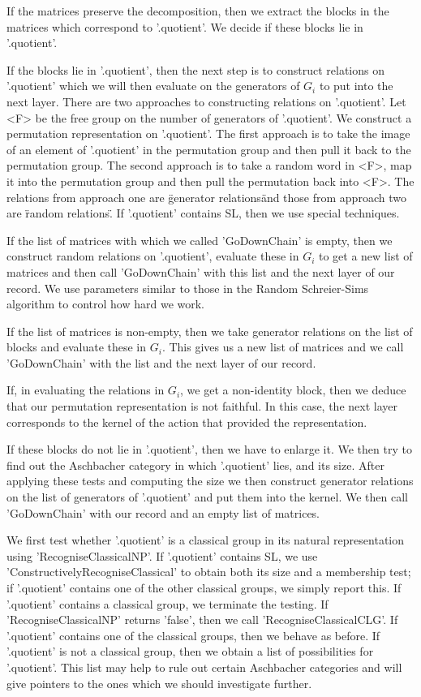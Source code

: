 If the matrices preserve the decomposition, then we extract the blocks in
the matrices  which correspond to '.quotient'. We  decide if these blocks
lie in '.quotient'.

If  the blocks lie  in  '.quotient', then the next   step is to construct
relations on '.quotient' which we will then evaluate on the generators of
$G_i$    to put into  the   next  layer. There   are   two approaches  to
constructing relations on  '.quotient'. Let <F>  be the free group on the
number of generators   of   '.quotient'.   We construct  a    permutation
representation on '.quotient'. The first approach is to take the image of
an element of '.quotient' in the permutation group and  then pull it back
to the permutation group. The second approach is to take a random word in
<F>, map it into the permutation group and then pull the permutation back
into <F>. The relations from approach one are \"generator relations\" and
those  from  approach two   are  \"random  relations\".   If  '.quotient'
contains SL, then we use special techniques.

If the list of matrices with which we called 'GoDownChain' is empty, then
we construct random relations on '.quotient', evaluate  these in $G_i$ to
get a new list of matrices and then call 'GoDownChain' with this list and
the next layer of our  record. We use parameters similar  to those in the
Random Schreier-Sims algorithm to control how hard we work.

If the list of matrices is non-empty, then we take generator relations on
the list of blocks and evaluate these in $G_i$.  This gives us a new list
of matrices and we call 'GoDownChain' with the list and the next layer of
our record.

If, in evaluating the  relations in $G_i$, we   get a non-identity block,
then we  deduce that our permutation  representation is not  faithful. In
this case,  the next layer  corresponds to the kernel  of the action that
provided the representation.

If these blocks do not lie in '.quotient', then we have to enlarge it. We
then try to find  out the Aschbacher  category in which '.quotient' lies,
and its size.  After applying these tests  and computing the size we then
construct generator relations on   the list of generators  of '.quotient'
and put them into the kernel.  We then call 'GoDownChain' with our record
and an empty list of matrices.

We first test whether '.quotient'  is a  classical  group in its  natural
representation using 'RecogniseClassicalNP'.  If '.quotient' contains SL,
we use 'Constructively\-Recognise\-Classical' to obtain both its size and
a membership test;  if '.quotient' contains one   of the other  classical
groups,  we  simply report  this.   If '.quotient'   contains a classical
group,  we terminate  the   testing.  If 'RecogniseClassicalNP'   returns
'false', then  we call  'RecogniseClassicalCLG'.  If '.quotient' contains
one of the classical groups, then we behave as before.  If '.quotient' is
not  a   classical group, then  we  obtain  a list  of  possibilities for
'.quotient'.    This  list may   help  to  rule   out  certain Aschbacher
categories and will give pointers to the ones which we should investigate
further.

